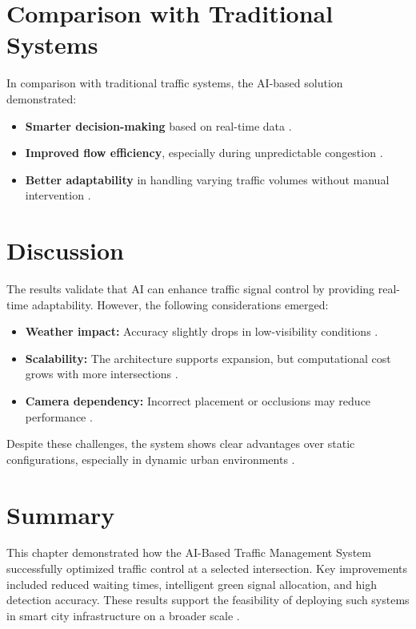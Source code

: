 \section{Comparison with Traditional Systems}

In comparison with traditional traffic systems, the AI-based solution demonstrated:

\begin{itemize}
    \item \textbf{Smarter decision-making} based on real-time data \cite{surtrac2018}.
    \item \textbf{Improved flow efficiency}, especially during unpredictable congestion \cite{li2019traffic}.
    \item \textbf{Better adaptability} in handling varying traffic volumes without manual intervention \cite{chen2018ai}.
\end{itemize}

\section{Discussion}

The results validate that AI can enhance traffic signal control by providing real-time adaptability. However, the following considerations emerged:

\begin{itemize}
    \item \textbf{Weather impact:} Accuracy slightly drops in low-visibility conditions \cite{huang2019weather}.
    \item \textbf{Scalability:} The architecture supports expansion, but computational cost grows with more intersections \cite{wang2020scalable}.
    \item \textbf{Camera dependency:} Incorrect placement or occlusions may reduce performance \cite{liu2019deep}.
\end{itemize}

Despite these challenges, the system shows clear advantages over static configurations, especially in dynamic urban environments \cite{zhao2017improving}.

\section{Summary}

This chapter demonstrated how the AI-Based Traffic Management System successfully optimized traffic control at a selected intersection. Key improvements included reduced waiting times, intelligent green signal allocation, and high detection accuracy. These results support the feasibility of deploying such systems in smart city infrastructure on a broader scale \cite{chen2018ai, li2019traffic}.
